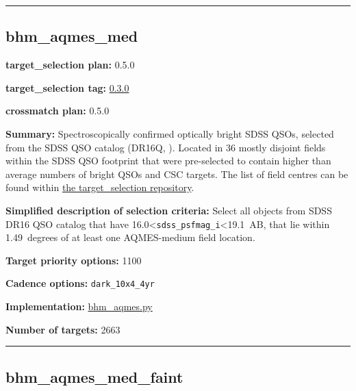 \begin{center}\rule{0.5\linewidth}{0.5pt}\end{center}

\hypertarget{bhm_aqmes_med_plan0.5.0}{%
\subsection{bhm\_aqmes\_med}\label{bhm_aqmes_med_plan0.5.0}}

\noindent\textbf{target\_selection plan:} 0.5.0

\noindent\textbf{target\_selection tag:}
\href{https://github.com/sdss/target_selection/tree/0.3.0/}{0.3.0}

\noindent\textbf{crossmatch plan:} 0.5.0

\noindent\textbf{Summary:} Spectroscopically confirmed optically bright SDSS
QSOs, selected from the SDSS QSO catalog (DR16Q,
\citealt{Lyke2020}). Located in 36 mostly disjoint fields within the SDSS QSO
footprint that were pre-selected to contain higher than average numbers
of bright QSOs and CSC targets. The list of field centres can be found
within
\href{https://github.com/sdss/target_selection/blob/0.3.0/python/target_selection/masks/candidate_target_fields_bhm_aqmes_med_v0.3.1.fits}{the
target\_selection repository}.

\noindent\textbf{Simplified description of selection criteria:} Select all
objects from SDSS DR16 QSO catalog that have
16.0\textless{}\texttt{sdss\_psfmag\_i}\textless19.1~AB, that lie within
1.49~degrees of at least one AQMES-medium field location.


\noindent\textbf{Target priority options:} 1100

\noindent\textbf{Cadence options:} \texttt{dark\_10x4\_4yr}

\noindent\textbf{Implementation:}
\href{https://github.com/sdss/target_selection/blob/0.3.0/python/target_selection/cartons/bhm_aqmes.py}{bhm\_aqmes.py}

\noindent\textbf{Number of targets:} 2663

\begin{center}\rule{0.5\linewidth}{0.5pt}\end{center}

\hypertarget{bhm_aqmes_med_faint_plan0.5.0}{%
\subsection{bhm\_aqmes\_med\_faint}\label{bhm_aqmes_med_faint_plan0.5.0}}

